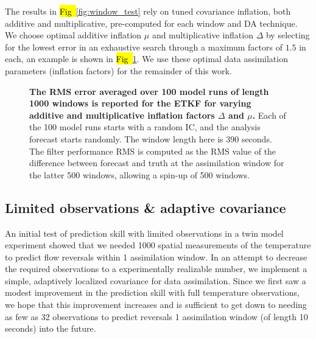 \documentclass[10pt,letterpaper]{article}
\begin{document}
The results in \hl{Fig~}\ref{fig:window_test} rely on tuned covariance inflation, both additive and multiplicative, pre-computed for each window and DA technique.
We choose optimal additive inflation $\mu$ and multiplicative inflation $\Delta$ by selecting for the lowest error in an exhaustive search through a maximum factors of $1.5$ in each, an example is shown in \hl{Fig~}\ref{fig:ETKF_cov_tuning_390s}.
We use these optimal data assimilation parameters (inflation factors) for the remainder of this work.

\begin{figure}[h]
  \centering
  \caption[The RMS error averaged over 100 model runs of length 1000 windows is reported for the ETKF for varying additive and multiplicative inflation factors]{
\textbf{    The RMS error averaged over 100 model runs of length 1000 windows is reported for the ETKF for varying additive and multiplicative inflation factors $\Delta$ and $\mu$.
}    Each of the 100 model runs starts with a random IC, and the analysis forecast starts randomly.
    The window length here is 390 seconds.
    The filter performance RMS is computed as the RMS value of the difference between forecast and truth at the assimilation window for the latter 500 windows, allowing a spin-up of 500 windows.
  }
  \label{fig:ETKF_cov_tuning_390s}
\end{figure}

\subsection*{Limited observations \& adaptive covariance}

An initial test of prediction skill with limited observations in a twin model experiment showed that we needed 1000 spatial measurements of the temperature to predict flow reversals within 1 assimilation window.
In an attempt to decrease the required observations to a experimentally realizable number, we implement a simple, adaptively localized covariance for data assimilation.
Since we first saw a modest improvement in the prediction skill with full temperature observations, we hope that this improvement increases and is sufficient to get down to needing as few as 32 observations to predict reversals 1 assimilation window (of length 10 seconds) into the future.
\end{document}

